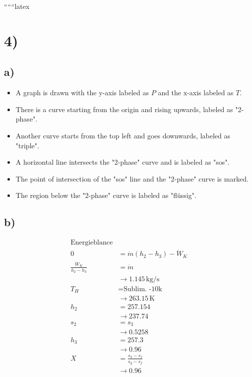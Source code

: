 
``````latex


\section*{4)}

\subsection*{a)}
\begin{itemize}
    \item A graph is drawn with the y-axis labeled as \(P\) and the x-axis labeled as \(T\).
    \item There is a curve starting from the origin and rising upwards, labeled as "2-phase".
    \item Another curve starts from the top left and goes downwards, labeled as "triple".
    \item A horizontal line intersects the "2-phase" curve and is labeled as "sos".
    \item The point of intersection of the "sos" line and the "2-phase" curve is marked.
    \item The region below the "2-phase" curve is labeled as "flüssig".
\end{itemize}

\subsection*{b)}
\begin{align*}
    \text{Energieblance} \\
    0 &= \dot{m} (h_2 - h_3) - \dot{W}_K \\
    \frac{\dot{W}_K}{h_2 - h_3} &= \dot{m} \\
    &\rightarrow 1.145 \, \text{kg/s} \\
    T_H &= \text{Sublim. -10k} \\
    &\rightarrow 263.15 \, \text{K} \\
    h_2 &= 257.154 \\
    &\rightarrow 237.74 \\
    s_2 &= s_3 \\
    &\rightarrow 0.5258 \\
    h_3 &= 257.3 \\
    &\rightarrow 0.96 \\
    X &= \frac{s_3 - s_f}{s_g - s_f} \\
    &\rightarrow 0.96
\end{align*}

